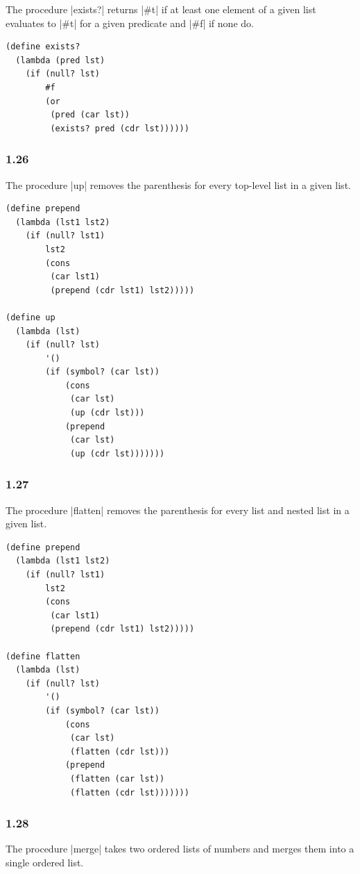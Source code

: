 \documentclass[a4paper]{article}
\begin{document}
The procedure |exists?| returns |#t| if at least one element of a given list evaluates to |#t| for a given predicate and |#f| if none do.

\begin{lstlisting}
(define exists?
  (lambda (pred lst)
    (if (null? lst)
        #f
        (or
         (pred (car lst))
         (exists? pred (cdr lst))))))
\end{lstlisting}

\subsubsection*{1.26}

The procedure |up| removes the parenthesis for every top-level list in a given list.

\begin{lstlisting}
(define prepend
  (lambda (lst1 lst2)
    (if (null? lst1)
        lst2
        (cons
         (car lst1)
         (prepend (cdr lst1) lst2)))))

(define up
  (lambda (lst)
    (if (null? lst)
        '()
        (if (symbol? (car lst))
            (cons
             (car lst)
             (up (cdr lst)))
            (prepend
             (car lst)
             (up (cdr lst)))))))
\end{lstlisting}

\subsubsection*{1.27}

The procedure |flatten| removes the parenthesis for every list and nested list in a given list.

\begin{lstlisting}
(define prepend
  (lambda (lst1 lst2)
    (if (null? lst1)
        lst2
        (cons
         (car lst1)
         (prepend (cdr lst1) lst2)))))

(define flatten
  (lambda (lst)
    (if (null? lst)
        '()
        (if (symbol? (car lst))
            (cons
             (car lst)
             (flatten (cdr lst)))
            (prepend
             (flatten (car lst))
             (flatten (cdr lst)))))))
\end{lstlisting}

\subsubsection*{1.28}

The procedure |merge| takes two ordered lists of numbers and merges them into a single ordered list.
\end{document}
